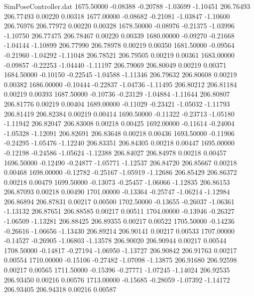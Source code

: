 \begin{filecontents}{SimPoseController.dat}
1675.50000   -0.08388   -0.20788    -1.03699   -1.10451  206.76493  206.77493    0.00220    0.00318
1677.00000   -0.08682   -0.21081    -1.03847   -1.10600  206.76976  206.77972    0.00220    0.00328
1678.50000   -0.08976   -0.21375    -1.03996   -1.10750  206.77475  206.78467    0.00220    0.00339
1680.00000   -0.09270   -0.21668    -1.04144   -1.10899  206.77990  206.78978    0.00219    0.00350
1681.50000   -0.09564   -0.21960    -1.04292   -1.11048  206.78521  206.79505    0.00219    0.00361
1683.00000   -0.09857   -0.22253    -1.04440   -1.11197  206.79069  206.80049    0.00219    0.00371
1684.50000   -0.10150   -0.22545    -1.04588   -1.11346  206.79632  206.80608    0.00219    0.00382
1686.00000   -0.10444   -0.22837    -1.04736   -1.11495  206.80212  206.81184    0.00219    0.00393
1687.50000   -0.10736   -0.23129    -1.04884   -1.11644  206.80807  206.81776    0.00219    0.00404
1689.00000   -0.11029   -0.23421    -1.05032   -1.11793  206.81419  206.82384    0.00219    0.00414
1690.50000   -0.11322   -0.23713    -1.05180   -1.11942  206.82047  206.83008    0.00218    0.00425
1692.00000   -0.11614   -0.24004    -1.05328   -1.12091  206.82691  206.83648    0.00218    0.00436
1693.50000   -0.11906   -0.24295    -1.05476   -1.12240  206.83351  206.84305    0.00218    0.00447
1695.00000   -0.12198   -0.24586    -1.05624   -1.12388  206.84027  206.84978    0.00218    0.00457
1696.50000   -0.12490   -0.24877    -1.05771   -1.12537  206.84720  206.85667    0.00218    0.00468
1698.00000   -0.12782   -0.25167    -1.05919   -1.12686  206.85429  206.86372    0.00218    0.00479
1699.50000   -0.13073   -0.25457    -1.06066   -1.12835  206.86153  206.87093    0.00218    0.00490
1701.00000   -0.13364   -0.25747    -1.06214   -1.12984  206.86894  206.87831    0.00217    0.00500
1702.50000   -0.13655   -0.26037    -1.06361   -1.13132  206.87651  206.88585    0.00217    0.00511
1704.00000   -0.13946   -0.26327    -1.06509   -1.13281  206.88425  206.89355    0.00217    0.00522
1705.50000   -0.14236   -0.26616    -1.06656   -1.13430  206.89214  206.90141    0.00217    0.00533
1707.00000   -0.14527   -0.26905    -1.06803   -1.13578  206.90020  206.90944    0.00217    0.00544
1708.50000   -0.14817   -0.27194    -1.06950   -1.13727  206.90842  206.91763    0.00217    0.00554
1710.00000   -0.15106   -0.27482    -1.07098   -1.13875  206.91680  206.92598    0.00217    0.00565
1711.50000   -0.15396   -0.27771    -1.07245   -1.14024  206.92535  206.93450    0.00216    0.00576
1713.00000   -0.15685   -0.28059    -1.07392   -1.14172  206.93405  206.94318    0.00216    0.00587

\end{filecontents}
